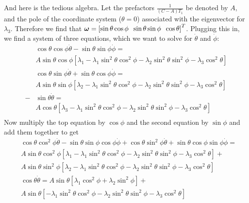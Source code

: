 \documentclass[extra,mreferee]{gji}
\begin{document}
And here is the tedious algebra.  Let the prefactors $\frac{1}{(C-A)T_1}$ be denoted by $A$, and the pole of the coordinate system ($\theta = 0$) associated with the eigenvector for $\lambda_3$.  Therefore we find that $\mitbf{\omega} = \left[ \sin{\theta} \cos{\phi} \;\; \sin{\theta} \sin{\phi} \;\; \cos{\theta} \right]^T$.  Plugging this in, we find a system of three equations, which we want to solve for $\dot{\theta}$ and $\dot{\phi}$:
\begin{equation}
\begin{aligned}
 & \cos{\theta}\cos{\phi} \dot{\theta}  - \sin{\theta}\sin{\phi} \dot{\phi} = \\
  &A \sin{\theta}\cos{\phi}\left[ \lambda_1 - \lambda_1 \sin^2{\theta}\cos^2{\phi} - \lambda_2 \sin^2{\theta}\sin^2{\phi} - \lambda_3 \cos^2{\theta} \right] \\
 &\cos{\theta}\sin{\phi} \dot{\theta}  + \sin{\theta}\cos{\phi} \dot{\phi} = \\
  &A \sin{\theta}\sin{\phi} \left[ \lambda_2 - \lambda_1 \sin^2{\theta}\cos^2{\phi} - \lambda_2 \sin^2{\theta}\sin^2{\phi} - \lambda_3 \cos^2{\theta} \right] \\
 - &\sin{\theta} \dot{\theta} = \\
  &A \cos{\theta} \left[ \lambda_3 - \lambda_1 \sin^2{\theta}\cos^2{\phi} - \lambda_2 \sin^2{\theta}\sin^2{\phi} - \lambda_3 \cos^2{\theta} \right] \\
\end{aligned}
\end{equation}
Now multiply the top equation by $\cos{\phi}$ and the second equation by $\sin{\phi}$ and add them together to get
\begin{equation}
\begin{aligned}
 & \cos{\theta}\cos^2{\phi} \dot{\theta}  - \sin{\theta}\sin{\phi} \cos{\phi} \dot{\phi} + \cos{\theta}\sin^2{\phi} \dot{\theta}  + \sin{\theta}\cos{\phi} \sin{\phi} \dot{\phi} = \\
  &A \sin{\theta}\cos^2{\phi}\left[ \lambda_1 - \lambda_1 \sin^2{\theta}\cos^2{\phi} - \lambda_2 \sin^2{\theta}\sin^2{\phi} - \lambda_3 \cos^2{\theta} \right] + \\
  &A \sin{\theta}\sin^2{\phi} \left[ \lambda_2 - \lambda_1 \sin^2{\theta}\cos^2{\phi} - \lambda_2 \sin^2{\theta}\sin^2{\phi} - \lambda_3 \cos^2{\theta} \right] \\
 & \cos{\theta}\dot{\theta} =  
   A \sin{\theta} \left[ \lambda_1 \cos^2{\phi} +  \lambda_2 \sin^2{\phi} \right] + \\
  &A \sin{\theta} \left[ - \lambda_1 \sin^2{\theta}\cos^2{\phi} - \lambda_2 \sin^2{\theta}\sin^2{\phi} - \lambda_3 \cos^2{\theta} \right] \\
\end{aligned}
\end{equation}
\end{document}
